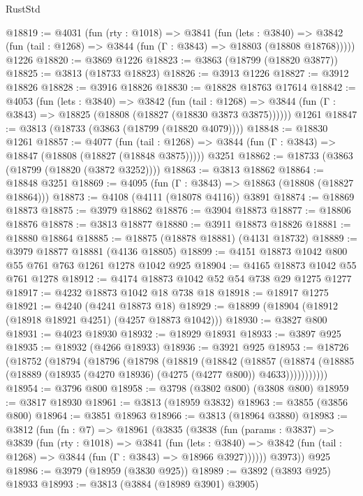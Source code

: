 \begin{lexlean}{RustStd}
\begin{coremodule}
@18819 := @4031
    (fun (rty : @1018) =>
    @3841
      (fun (lets : @3840) =>
      @3842 (fun (tail : @1268) => @3844 (fun (Γ : @3843) => @18803 (@18808 @18768)))))
    @1226
@18820 := @3869 @1226
@18823 := @3863 (@18799 (@18820 @3877))
@18825 := @3813 (@18733 @18823)
@18826 := @3913 @1226
@18827 := @3912 @18826
@18828 := @3916 @18826
@18830 := @18828 @18763 @17614
@18842 := @4053
    (fun (lets : @3840) =>
    @3842
      (fun (tail : @1268) =>
      @3844 (fun (Γ : @3843) => @18825 (@18808 (@18827 (@18830 @3873 @3875))))))
    @1261
@18847 := @3813 (@18733 (@3863 (@18799 (@18820 @4079))))
@18848 := @18830 @1261
@18857 := @4077
    (fun (tail : @1268) => @3844 (fun (Γ : @3843) => @18847 (@18808 (@18827 (@18848 @3875)))))
    @3251
@18862 := @18733 (@3863 (@18799 (@18820 (@3872 @3252))))
@18863 := @3813 @18862
@18864 := @18848 @3251
@18869 := @4095 (fun (Γ : @3843) => @18863 (@18808 (@18827 @18864)))
@18873 := @4108 (@4111 (@18078 @4116)) @3891
@18874 := @18869 @18873
@18875 := @3979 @18862
@18876 := @3904 @18873
@18877 := @18806 @18876
@18878 := @3813 @18877
@18880 := @3911 @18873 @18826
@18881 := @18880 @18864
@18885 := @18875 (@18878 @18881) (@4131 @18732)
@18889 := @3979 @18877 @18881 (@4136 @18805)
@18899 := @4151 @18873 @1042 @800 @55 @761 @763 @1261 @1278 @1042 @925
@18904 := @4165 @18873 @1042 @55 @761 @1278
@18912 := @4174 @18873 @1042 @52 @54 @738 @29 @1275 @1277
@18917 := @4232 @18873 @1042 @18 @738 @18
@18918 := @18917 @1275
@18921 := @4240 (@4241 @18873 @18)
@18929 := @18899 (@18904 (@18912 (@18918 @18921 @4251) (@4257 @18873 @1042)))
@18930 := @3827 @800
@18931 := @4023 @18930
@18932 := @18929 @18931
@18933 := @3897 @925
@18935 := @18932 (@4266 @18933)
@18936 := @3921 @925
@18953 := @18726
    (@18752
      (@18794
        (@18796
          (@18798
            (@18819
              (@18842
                (@18857
                  (@18874
                    (@18885 (@18889 (@18935 (@4270 @18936) (@4275 (@4277 @800)) @4633)))))))))))
@18954 := @3796 @800
@18958 := @3798 (@3802 @800) (@3808 @800)
@18959 := @3817 @18930
@18961 := @3813 (@18959 @3832)
@18963 := @3855 (@3856 @800)
@18964 := @3851 @18963
@18966 := @3813 (@18964 @3880)
@18983 := @3812
    (fun (fn : @7) =>
    @18961
      (@3835
        (@3838
          (fun (params : @3837) =>
          @3839
            (fun (rty : @1018) =>
            @3841
              (fun (lets : @3840) =>
              @3842 (fun (tail : @1268) => @3844 (fun (Γ : @3843) => @18966 @3927))))))
        @3973))
    @925
@18986 := @3979 (@18959 (@3830 @925))
@18989 := @3892 (@3893 @925) @18933
@18993 := @3813 (@3884 (@18989 @3901) @3905)

\end{coremodule}
\end{lexlean}
